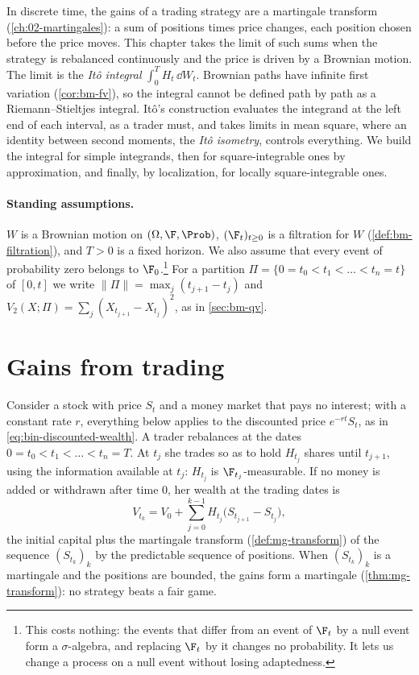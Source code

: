 
In discrete time, the gains of a trading strategy are a martingale transform
(\cref{ch:02-martingales}): a sum of positions times price changes, each position chosen
before the price moves. This chapter takes the limit of such sums when the strategy is
rebalanced continuously and the price is driven by a Brownian motion. The limit is the
\emph{It\^o integral} $\int_0^TH_t\,\dd W_t$. Brownian paths have infinite first variation
(\cref{cor:bm-fv}), so the integral cannot be defined path by path as a Riemann--Stieltjes
integral. It\^o's construction evaluates the integrand at the left end of each interval, as
a trader must, and takes limits in mean square, where an identity between second moments,
the \emph{It\^o isometry}, controls everything. We build the integral for simple integrands,
then for square-integrable ones by approximation, and finally, by localization, for locally
square-integrable ones.

\paragraph{Standing assumptions.} $W$ is a Brownian motion on $(\Omega,\F,\Prob)$,
$(\F_t)_{t\ge0}$ is a filtration for $W$ (\cref{def:bm-filtration}), and $T>0$ is a fixed
horizon. We also assume that every event of probability zero belongs to $\F_0$.\footnote{This
costs nothing: the events that differ from an event of $\F_t$ by a null event form a
$\sigma$-algebra, and replacing $\F_t$ by it changes no probability. It lets us change a
process on a null event without losing adaptedness.} For a partition
$\Pi=\{0=t_0<t_1<\dots<t_n=t\}$ of $[0,t]$ we write $\|\Pi\|=\max_j(t_{j+1}-t_j)$ and
$V_2(X;\Pi)=\sum_j(X_{t_{j+1}}-X_{t_j})^2$, as in \cref{sec:bm-qv}.

\section{Gains from trading}\label{sec:ito-gains}

Consider a stock with price $S_t$ and a money market that pays no interest; with a constant
rate $r$, everything below applies to the discounted price $e^{-rt}S_t$, as in
\eqref{eq:bin-discounted-wealth}. A trader rebalances at the dates $0=t_0<t_1<\dots<t_n=T$.
At $t_j$ she trades so as to hold $H_{t_j}$ shares until $t_{j+1}$, using the information
available at $t_j$: $H_{t_j}$ is $\F_{t_j}$-measurable. If no money is added or withdrawn
after time $0$, her wealth at the trading dates is
\[
  V_{t_k}=V_0+\sum_{j=0}^{k-1}H_{t_j}\big(S_{t_{j+1}}-S_{t_j}\big),
\]
the initial capital plus the martingale transform (\cref{def:mg-transform}) of the sequence
$(S_{t_k})_k$ by the predictable sequence of positions. When $(S_{t_k})_k$ is a martingale
and the positions are bounded, the gains form a martingale (\cref{thm:mg-transform}): no
strategy beats a fair game.


